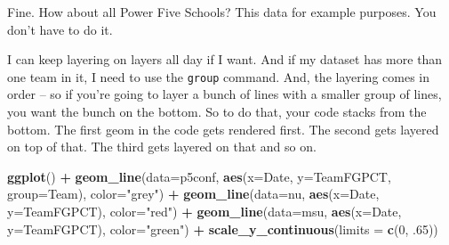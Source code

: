 \documentclass[
]{book}
\newenvironment{Shaded}{\begin{snugshade}}{\end{snugshade}}
\newcommand{\DataTypeTok}[1]{\textcolor[rgb]{0.13,0.29,0.53}{#1}}
\newcommand{\DecValTok}[1]{\textcolor[rgb]{0.00,0.00,0.81}{#1}}
\newcommand{\FloatTok}[1]{\textcolor[rgb]{0.00,0.00,0.81}{#1}}
\newcommand{\KeywordTok}[1]{\textcolor[rgb]{0.13,0.29,0.53}{\textbf{#1}}}
\newcommand{\NormalTok}[1]{#1}
\newcommand{\OperatorTok}[1]{\textcolor[rgb]{0.81,0.36,0.00}{\textbf{#1}}}
\newcommand{\StringTok}[1]{\textcolor[rgb]{0.31,0.60,0.02}{#1}}
\begin{document}
Fine. How about all Power Five Schools? This data for example purposes. You don't have to do it.

\begin{Shaded}
\end{Shaded}

I can keep layering on layers all day if I want. And if my dataset has more than one team in it, I need to use the \texttt{group} command. And, the layering comes in order -- so if you're going to layer a bunch of lines with a smaller group of lines, you want the bunch on the bottom. So to do that, your code stacks from the bottom. The first geom in the code gets rendered first. The second gets layered on top of that. The third gets layered on that and so on.

\begin{Shaded}
\begin{Highlighting}[]
\KeywordTok{ggplot}\NormalTok{() }\OperatorTok{+}\StringTok{ }\KeywordTok{geom_line}\NormalTok{(}\DataTypeTok{data=}\NormalTok{p5conf, }\KeywordTok{aes}\NormalTok{(}\DataTypeTok{x=}\NormalTok{Date, }\DataTypeTok{y=}\NormalTok{TeamFGPCT, }\DataTypeTok{group=}\NormalTok{Team), }\DataTypeTok{color=}\StringTok{"grey"}\NormalTok{) }\OperatorTok{+}\StringTok{ }\KeywordTok{geom_line}\NormalTok{(}\DataTypeTok{data=}\NormalTok{nu, }\KeywordTok{aes}\NormalTok{(}\DataTypeTok{x=}\NormalTok{Date, }\DataTypeTok{y=}\NormalTok{TeamFGPCT), }\DataTypeTok{color=}\StringTok{"red"}\NormalTok{) }\OperatorTok{+}\StringTok{ }\KeywordTok{geom_line}\NormalTok{(}\DataTypeTok{data=}\NormalTok{msu, }\KeywordTok{aes}\NormalTok{(}\DataTypeTok{x=}\NormalTok{Date, }\DataTypeTok{y=}\NormalTok{TeamFGPCT), }\DataTypeTok{color=}\StringTok{"green"}\NormalTok{) }\OperatorTok{+}\StringTok{ }\KeywordTok{scale_y_continuous}\NormalTok{(}\DataTypeTok{limits =} \KeywordTok{c}\NormalTok{(}\DecValTok{0}\NormalTok{, }\FloatTok{.65}\NormalTok{))}
\end{Highlighting}
\end{Shaded}
\end{document}
